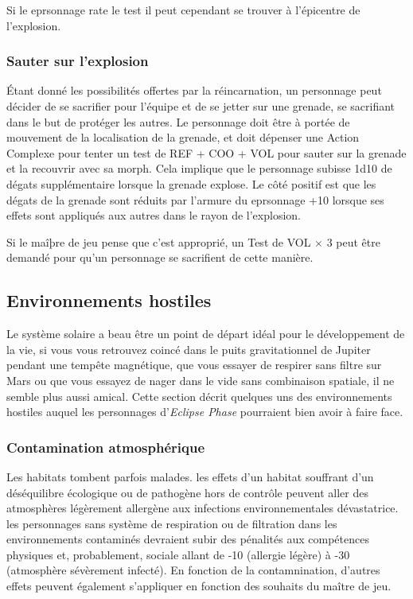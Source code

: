 Si le eprsonnage rate le test il peut cependant se trouver à l'épicentre de l'explosion. 

\subsubsection{Sauter sur l'explosion} 

Étant donné les possibilités offertes par la réincarnation, un personnage peut décider de se sacrifier pour l'équipe et de se jetter sur une grenade, se sacrifiant dans le but de protéger les autres. Le personnage doit être à portée de mouvement de la localisation de la grenade, et doit dépenser une Action Complexe pour tenter un test de REF + COO + VOL pour sauter sur la grenade et la recouvrir avec sa morph. Cela implique que le personnage subisse 1d10 de dégats supplémentaire lorsque la grenade explose. Le côté positif est que les dégats de la grenade sont réduits par l'armure du eprsonnage +10 lorsque ses effets sont appliqués aux autres dans le rayon de l'explosion. 

Si le maîþre de jeu pense que c'est approprié, un Test de VOL $\times$ 3 peut être demandé pour qu'un personnage se sacrifient de cette manière. 

\subsection{Environnements hostiles} \label{sec:hostile-environments} Le système solaire a beau être un point de départ idéal pour le développement de la vie, si vous vous retrouvez coincé dans le puits gravitationnel de Jupiter pendant une tempête magnétique, que vous essayer de respirer sans filtre sur Mars ou que vous essayez de nager dans le vide sans combinaison spatiale, il ne semble plus aussi amical. Cette section décrit quelques uns des environnements hostiles auquel les personnages d'\emph{Eclipse Phase} pourraient bien avoir à faire face. 

\subsubsection{Contamination atmosphérique} 

Les habitats tombent parfois malades. les effets d'un habitat souffrant d'un déséquilibre écologique ou de pathogène hors de contrôle peuvent aller des atmosphères légèrement allergène aux infections environnementales dévastatrice. les personnages sans système de respiration ou de filtration dans les environnements contaminés devraient subir des pénalités aux compétences physiques et, probablement, sociale allant de -10 (allergie légère) à -30 (atmosphère sévèrement infecté). En fonction de la contamnination, d'autres effets peuvent également s'appliquer en fonction des souhaits du maître de jeu. 

